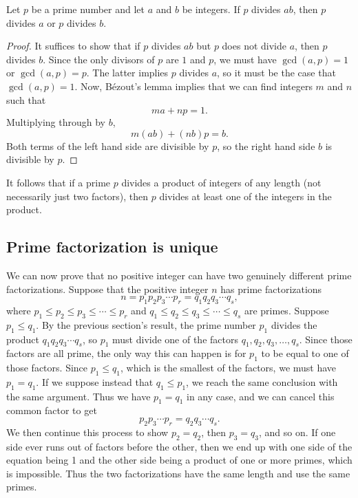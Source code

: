 \begin{proposition}
Let $p$ be a prime number and let $a$ and $b$ be integers. If $p$ divides $ab$, then $p$ divides $a$ or $p$ divides $b$.
\end{proposition}
\begin{proof}
It suffices to show that if $p$ divides $ab$ but $p$ does not divide $a$, then $p$ divides $b$. Since the only divisors of $p$ are $1$ and $p$, we must have $\gcd(a,p) = 1$ or $\gcd(a,p) = p$. The latter implies $p$ divides $a$, so it must be the case that $\gcd(a,p) = 1$. Now, B\'{e}zout's lemma implies that we can find integers $m$ and $n$ such that
\begin{equation*}
ma + np = 1.
\end{equation*}
Multiplying through by $b$,
\begin{equation*}
m(ab) + (nb)p = b.
\end{equation*}
Both terms of the left hand side are divisible by $p$, so the right hand side $b$ is divisible by $p$.
\end{proof}

It follows that if a prime $p$ divides a product of integers of any length (not necessarily just two factors), then $p$ divides at least one of the integers in the product.


\subsection{Prime factorization is unique}

We can now prove that no positive integer can have two genuinely different prime factorizations. Suppose that the positive integer $n$ has prime factorizations
\begin{equation*}
n = p_1p_2p_3\cdots p_r = q_1q_2q_3\cdots q_s,
\end{equation*}
where $p_1\leq p_2\leq p_3\leq\cdots\leq p_r$ and $q_1\leq q_2\leq q_3\leq\cdots\leq q_s$ are primes. Suppose $p_1\leq q_1$. By the previous section's result, the prime number $p_1$ divides the product $q_1q_2q_3\cdots q_s$, so $p_1$ must divide one of the factors $q_1, q_2, q_3, \ldots, q_s$. Since those factors are all prime, the only way this can happen is for $p_1$ to be equal to one of those factors. Since $p_1\leq q_1$, which is the smallest of the factors, we must have $p_1 = q_1$. If we suppose instead that $q_1\leq p_1$, we reach the same conclusion with the same argument. Thus we have $p_1 = q_1$ in any case, and we can cancel this common factor to get
\begin{equation*}
p_2p_3\cdots p_r = q_2q_3\cdots q_s.
\end{equation*}
We then continue this process to show $p_2 = q_2$, then $p_3 = q_3$, and so on. If one side ever runs out of factors before the other, then we end up with one side of the equation being 1 and the other side being a product of one or more primes, which is impossible. Thus the two factorizations have the same length and use the same primes.